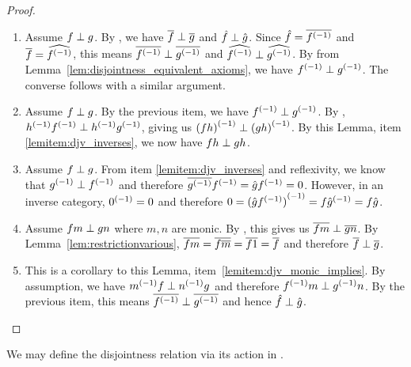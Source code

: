 \begin{proof}
  \prepprooflist
  \begin{enumerate}[{(}i{)}]
    \item Assume $f \perp g$. By , we have $\overline{f} \perp \overline{g}$ and
      $\hat{f}\perp\hat{g}$. Since $\hat{f} = \overline{{f}^{(-1)}}$ and $\overline{f} = \widehat{{f}^{(-1)}}$, this
      means $\overline{{f}^{(-1)}} \perp \overline{{g}^{(-1)}}$ and $\widehat{{f}^{(-1)}}\perp\widehat{{g}^{(-1)}}$. By
       from Lemma~\ref{lem:disjointness_equivalent_axioms}, we have
      ${f}^{(-1)} \perp {g}^{(-1)}$. The converse follows with  a similar argument.
    \item Assume $f \perp g$. By the previous item, we have ${f}^{(-1)}\perp{g}^{(-1)}$. By
      , ${h}^{(-1)}{f}^{(-1)}\perp{h}^{(-1)}{g}^{(-1)}$, giving us ${(f h)}^{(-1)} \perp
      {(g h)}^{(-1)}$. By this Lemma, item \ref{lemitem:djv_inverses}, we now have $f h \perp g h$.
    \item Assume $f \perp g$. From item \ref{lemitem:djv_inverses} and reflexivity, we know that
      ${g}^{(-1)}
      \perp {f}^{(-1)}$ and therefore $\overline{{g}^{(-1)}}{f}^{(-1)} = \hat{g}{f}^{(-1)}= 0$. However, in an
      inverse category, ${0}^{(-1)} = 0$ and therefore $0 = {(\hat{g}{f}^{(-1)})}^{(-1)} = f {\hat{g}}^{(-1)} = f
      \hat{g}$.
    \item Assume $f m \perp g n$ where $m, n$ are monic. By , this gives us
      $\overline{f m} \perp \overline{g n}$. By Lemma~\ref{lem:restrictionvarious},
      $\overline{f m} = \overline{f \overline{m}} = \overline{f 1} = \overline{f}$ and therefore $\overline{f} \perp \overline{g}$.
    \item This is a corollary to this Lemma, item~\ref{lemitem:djv_monic_implies}. By assumption,
      we have ${m}^{(-1)} f \perp  {n}^{(-1)}g$ and therefore ${f}^{(-1)}m \perp {g}^{(-1)} n$. By the
      previous item, this means $\overline{{f}^{(-1)}} \perp \overline{{g}^{(-1)}}$ and hence $\hat{f} \perp \hat{g}$.
  \end{enumerate}
\end{proof}

We may define the disjointness relation via its action in .

